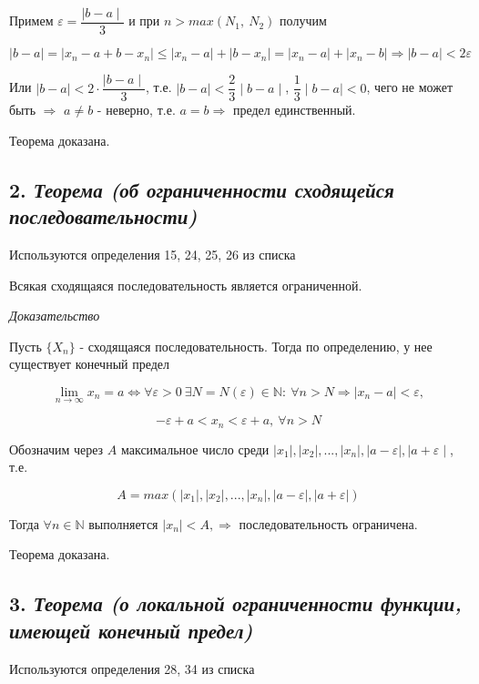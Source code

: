 Примем ${\varepsilon} = {\dfrac{\mid  b - a\mid  }{3}}$ и при $n > max(N_1, \ N_2)$ получим

$$
| b - a|  = | x_n - a + b - x_n|  \leqslant | x_n - a|  + | b - x_n|  = | x_n - a|  + | x_n - b|  \Rightarrow | b - a|  < 2{\varepsilon}
$$

Или $\mid  b-a\mid   < 2 \cdot {\dfrac{\mid  b - a\mid  }{3}}$, т.е. $\mid  b-a\mid   < \dfrac{2}{3}\mid  b - a\mid  $, $\dfrac{1}{3}\mid  b-a\mid   < 0$, чего не может быть $\Rightarrow$ $a \neq b$ - неверно, т.е. $a = b \Rightarrow$ предел единственный.

Теорема доказана.
\newpage 
\subsection*{2. \textit{Теорема (об ограниченности сходящейся последовательности)}}
\begin{Quote2} 
\small\centering 

Используются определения 15, 24, 25, 26 из списка \end{Quote2} 

Всякая сходящаяся последовательность является ограниченной.
\vspace*{20pt} 

\textit{Доказательство}

Пусть $\{X_n\}$ - сходящаяся последовательность. Тогда по определению, у нее существует конечный предел

$$
\lim\limits_{n \to \infty}x_n = a \iff \forall {\varepsilon} > 0 \ \exists N = N({\varepsilon})\in \mathbb{N}: \ \forall n > N \Rightarrow | x_n - a|  < {\varepsilon},
$$

$$
-{\varepsilon}+a < x_n < {\varepsilon} + a, \ \forall n > N
$$

Обозначим через $A$ максимальное число среди $\mid  x_1\mid  , \mid  x_2\mid  , ..., \mid  x_n\mid  , \mid  a-{\varepsilon}\mid  , \mid  a + {\varepsilon}\mid  $, т.е.

$$
A = max(| x_1| , | x_2| , ..., | x_n| , | a-{\varepsilon}| , | a + {\varepsilon}| )
$$

Тогда $\forall n \in \mathbb{N}$ выполняется $\mid  x_n\mid   < A, \Rightarrow$ последовательность ограничена.

Теорема доказана.
\newpage 
\subsection*{3. \textit{Теорема (о локальной ограниченности функции, имеющей конечный предел)}}
\begin{Quote2} 
\small\centering 

Используются определения 28, 34 из списка \end{Quote2} 

